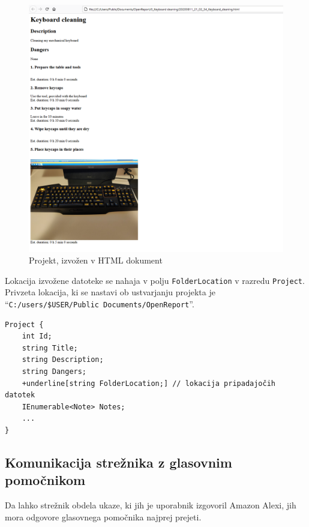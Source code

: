 \documentclass[a4paper, 12pt]{book}
\begin{document}
\begin{figure}[H]
\begin{center}
\includegraphics[width=13cm]{export_html}
\end{center}
\caption{Projekt, izvožen v HTML dokument}
\label{export_html}
\end{figure}

Lokacija izvožene datoteke se nahaja v polju \texttt{FolderLocation} v razredu \texttt{Project}.
Privzeta lokacija, ki se nastavi ob ustvarjanju projekta je 
\\\enquote{\texttt{C:/users/\$USER/Public Documents/OpenReport}}.

\begin{Verbatim}[commandchars=+\[\]]
Project {
    int Id; 
    string Title; 
    string Description; 
    string Dangers; 
    +underline[string FolderLocation;] // lokacija pripadajočih datotek 
    IEnumerable<Note> Notes; 
    ... 
}
\end{Verbatim}

\subsection{Komunikacija strežnika z glasovnim pomočnikom}

Da lahko strežnik obdela ukaze, ki jih je uporabnik izgovoril Amazon Alexi, jih mora odgovore glasovnega pomočnika najprej prejeti.
\end{document}
